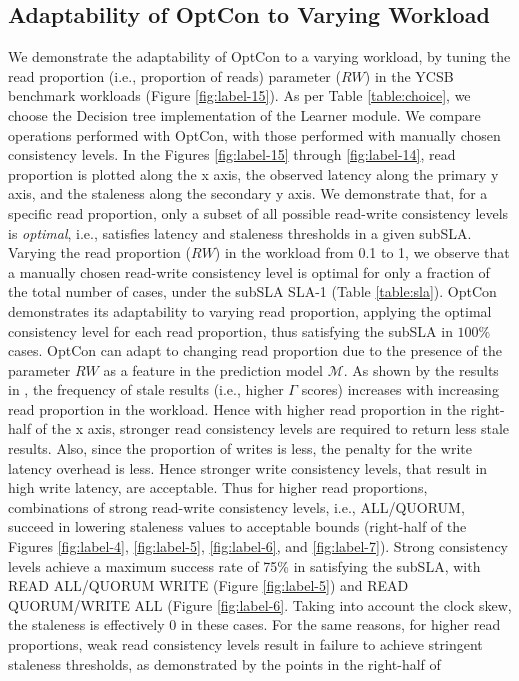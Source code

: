 \documentclass[conference]{IEEEtran}
\begin{document}
\subsection{Adaptability  of OptCon to Varying Workload}\label{sec:vary}We demonstrate the adaptability  of OptCon to a varying workload, by tuning the
read proportion (i.e., proportion of reads) parameter ($RW$) in the YCSB benchmark workloads (Figure \ref{fig:label-15}).
As per Table \ref{table:choice}, we choose the Decision tree  implementation of the Learner module. We compare operations performed
with OptCon, with those performed with manually chosen consistency levels. In the Figures \ref{fig:label-15}
through \ref{fig:label-14}, read proportion is plotted along the x axis, the observed latency along the primary y
axis, and the staleness along the secondary y axis.
  We demonstrate that, for a specific read proportion, only
 a subset of all possible read-write consistency levels is \emph{optimal}, i.e., satisfies latency and
 staleness thresholds in a given subSLA. Varying the read proportion ($RW$) in the workload from 0.1 to 1, we
 observe that a manually chosen read-write consistency level is optimal for only a fraction of the total number of cases,
 under the subSLA SLA-1 (Table \ref{table:sla}). OptCon demonstrates its adaptability to varying read proportion, applying
 the optimal consistency level for each read proportion, thus satisfying the subSLA in $100\%$ cases. OptCon can adapt to changing read proportion due to the presence of the parameter $RW$ as a feature in the prediction model $\mathcal{M}$. As shown by the results in \cite{DBLP:conf/cloud/GolabRAKWG13}, the frequency of stale results (i.e., higher
$\Gamma$ scores) increases with increasing read proportion in the workload. Hence with higher read proportion in the right-half of the x axis, stronger read consistency levels are required to return less stale results. Also, since the proportion
 of writes is less, the penalty for the write latency overhead is less. Hence stronger write consistency levels, that result in high write latency, are acceptable. Thus for higher read proportions, combinations of strong read-write consistency levels, i.e., ALL/QUORUM, succeed in lowering staleness values to acceptable bounds (right-half of the Figures \ref{fig:label-4}, \ref{fig:label-5}, \ref{fig:label-6},  and  \ref{fig:label-7}).  Strong consistency levels achieve a maximum success rate of 75\% in satisfying the subSLA, with READ ALL/QUORUM WRITE (Figure \ref{fig:label-5}) and READ QUORUM/WRITE ALL (Figure \ref{fig:label-6}. Taking into account the clock skew, the staleness is effectively 0 in these cases.  For the same reasons, for higher read proportions, weak read consistency levels result in failure to achieve stringent staleness thresholds, as demonstrated by the points in the right-half of
\end{document}
